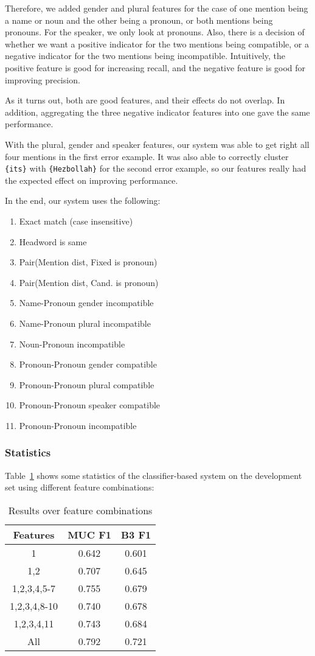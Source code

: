 \documentclass[12pt, twocolumn]{article}
\begin{document}
Therefore, we added gender and plural features for the case of one mention being a name or noun and the other being a pronoun, or both mentions being pronouns. For the speaker, we only look at pronouns. Also, there is a decision of whether we want a positive indicator for the two mentions being compatible, or a negative indicator for the two mentions being incompatible. Intuitively, the positive feature is good for increasing recall, and the negative feature is good for improving precision.

As it turns out, both are good features, and their effects do not overlap. In addition, aggregating the three negative indicator features into one gave the same performance.

With the plural, gender and speaker features, our system was able to get right all four mentions in the first error example.
It was also able to correctly cluster \texttt{\{its\}} with \texttt{\{Hezbollah\}} for the second error example, so our features really had the expected effect on improving performance.

In the end, our system uses the following:
\begin{enumerate}[(1)]
\item Exact match (case insensitive)
\item Headword is same
\item Pair(Mention dist, Fixed is pronoun) 
\item Pair(Mention dist, Cand. is pronoun) 
\item Name-Pronoun gender incompatible
\item Name-Pronoun plural incompatible
\item Noun-Pronoun incompatible
\item Pronoun-Pronoun gender compatible
\item Pronoun-Pronoun plural compatible
\item Pronoun-Pronoun speaker compatible
\item Pronoun-Pronoun incompatible
\end{enumerate}
\subsubsection{Statistics}
Table~\ref{tab:features} shows some statistics of the classifier-based system on the development set using different feature combinations:
\begin{table}[H]
\begin{center}
\begin{tabular}{|c|c|c|}
\hline
Features & MUC F1 & B3 F1\\\hline
1 & 0.642 & 0.601 \\\hline
1,2 & 0.707 & 0.645 \\\hline
1,2,3,4,5-7 & 0.755 & 0.679\\\hline
1,2,3,4,8-10 & 0.740 & 0.678\\\hline
1,2,3,4,11 & 0.743 & 0.684 \\\hline
All & 0.792 & 0.721 \\\hline
\end{tabular}
\end{center}
\caption{Results over feature combinations}
\label{tab:features}
\end{table}
\end{document}
